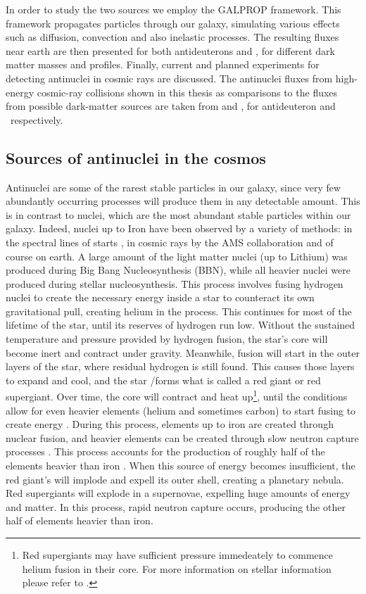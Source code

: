 In order to study the two sources we employ the GALPROP framework\cite{}. This framework propagates particles through our galaxy, simulating various effects such as diffusion, convection and also inelastic processes. The resulting fluxes near earth are then presented for both antideuterons and \ahe, for different dark matter masses and profiles. Finally, current and planned experiments for detecting antinuclei in cosmic rays are discussed. 
The antinuclei fluxes from high-energy cosmic-ray collisions shown in this thesis as comparisons to the fluxes from possible dark-matter sources are taken from \cite{dbar_prop} and \cite{ALICE-PUBLIC-2022-001}, for antideuteron and \ahe\ respectively.\\




\subsection{Sources of antinuclei in the cosmos}
Antinuclei are some of the rarest stable particles in our galaxy, since very few abundantly occurring processes will produce them in any detectable amount\cite{}. This is in contrast to nuclei, which are the most abundant stable particles within our galaxy. Indeed, nuclei up to Iron have been observed by a variety of methods: in the spectral lines of starts \cite{}, in cosmic rays by the AMS collaboration \cite{} and of course on earth. A large amount of the light matter nuclei (up to Lithium) was produced during Big Bang Nucleosynthesis (BBN)\cite{}, while all heavier nuclei were produced during stellar nucleosynthesis\cite{}. This process involves fusing hydrogen nuclei to create the necessary energy inside a star to counteract its own gravitational pull, creating helium in the process. This continues for most of the lifetime of the star, until its reserves of hydrogen run low. Without the sustained temperature and pressure provided by hydrogen fusion, the star's core will become inert and contract under gravity. Meanwhile, fusion will start in the outer layers of the star, where residual hydrogen is still found. This causes those layers to expand and cool, and the star /forms what is called a red giant\cite{} or red supergiant\cite{}. Over time, the core will contract and heat up\footnote{Red supergiants may have sufficient pressure immedeately to commence helium fusion in their core. For more information on stellar information please refer to \cite{}.}, until the conditions allow for even heavier elements (helium and sometimes carbon) to start fusing to create energy \cite{}. During this process, elements up to iron are created through nuclear fusion, and heavier elements can be created through slow neutron capture processes \cite{}. This process accounts for the production of roughly half of the elements heavier than iron \cite{}. When this source of energy becomes insufficient, the red giant's will implode and expell its outer shell, creating a planetary nebula. Red supergiants will explode in a supernovae\cite{}, expelling huge amounts of energy and matter. In this process, rapid neutron capture occurs, producing the other half of elements heavier than iron\cite{}. \\
